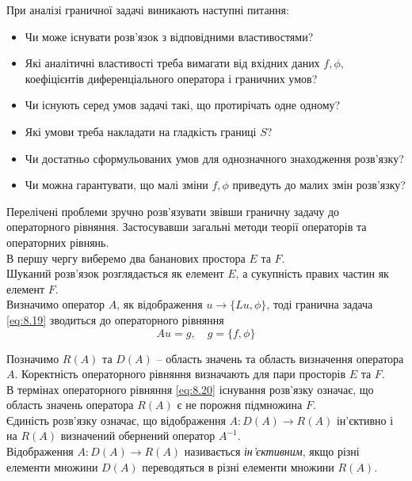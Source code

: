 При аналізі граничної задачі виникають наступні питання:
\begin{itemize}
	\item Чи може існувати розв'язок з відповідними властивостями?
	\item Які аналітичні властивості треба вимагати від вхідних даних $f, \phi$, коефіцієнтів диференціального оператора і граничних умов?
	\item Чи існують серед умов задачі такі, що протирічать одне одному?
	\item Які умови треба накладати на гладкість границі $S$?
	\item Чи достатньо сформульованих умов для однозначного знаходження розв'язку?
	\item Чи можна гарантувати, що малі зміни $f, \phi$ приведуть до малих змін розв'язку?
\end{itemize}

Перелічені проблеми зручно розв'язувати звівши граничну задачу до операторного рівняння. Застосувавши загальні методи теорії операторів та операторних рівнянь. \\

В першу чергу виберемо два бананових простора $E$ та $F$. \\

Шуканий розв'язок розглядається як елемент $E$, а сукупність правих частин як елемент $F$. \\

Визначимо оператор $A$, як відображення $u \to \{ Lu, \phi \}$, тоді гранична задача \eqref{eq:8.19} зводиться до операторного рівняння
\begin{equation}
	\label{eq:8.20}
	A u = g, \quad g = \{ f, \phi \}
\end{equation}

Позначимо $R(A)$ та $D(A)$ -- область значень та область визначення оператора $A$. Коректність операторного рівняння визначають для пари просторів $E$ та $F$. \\

В термінах операторного рівняння \eqref{eq:8.20} існування розв'язку означає, що область значень оператора $R(A)$ є не порожня підмножина $F$. \\

Єдиність розв'язку означає, що відображення $A: D(A) \to R(A)$ ін'єктивно і на $R(A)$ визначений обернений оператор $A^{-1}$. \\

Відображення $A: D(A) \to R(A)$ називається \textit{ін'єктивним}, якщо різні елементи множини $D(A)$ переводяться в різні елементи множини $R(A)$. \\


